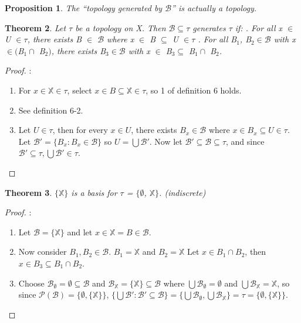 \documentclass{amsart}
\theoremstyle{plain}
\newtheorem{theorem}{Theorem}
\newtheorem{proposition}[theorem]{Proposition}
\theoremstyle{definition}
\theoremstyle{remark}
\begin{document}
	\begin{proposition}
		The ``topology generated by \(\mathcal{B}\)'' is actually a topology.
	\end{proposition}

	\begin{theorem}
	Let $\tau$ be a topology on X. Then $\mathcal{B} \subseteq \tau$ generates $\tau$ if:
	. For all x $\in$ U $\in \tau$, there exists B $\in$ $\mathcal{B}$ where x $\in$ B $\subseteq$ U $\in \tau$
	. For all B$_1$, B$_2 \in \mathcal{B}$ with x $\in ($B$_1 \cap$ B$_2)$, there exists B$_3 \in \mathcal{B}$ with x $\in$ B$_3 \subseteq$ B$_1 \cap$ B$_2$.
\end{theorem}
\begin{proof}:\newline
	\begin{enumerate}
		\item For $x \in \mathbb{X} \in \tau$, select $x \in B \subseteq \mathbb{X} \in \tau$, so 1 of definition 6 holds.
		\item See definition 6-2.
		\item Let $U \in \tau$, then for every $x \in U$, there exists $B_x \in \mathcal{B}$ where $x \in B_x \subseteq U \in \tau$. Let $\mathcal{B'} = \lbrace B_x : B_x \in \mathcal{B} \rbrace$ so $U = \bigcup \mathcal{B'}$. Now let $\mathcal{B'} \subseteq \mathcal{B} \subseteq \tau$, and since $\mathcal{B'} \subseteq \tau, \bigcup \mathcal{B'} \in \tau$.
		\end{enumerate}
\end{proof}

	\begin{theorem}
	$\lbrace\mathbb{X}\rbrace$ is a basis for $\tau$ = $\lbrace\emptyset$, $\mathbb{X}\rbrace$. (indiscrete)
	\end{theorem}
	\begin{proof}:\newline
	\begin{enumerate}
		\item Let $\mathcal{B} = \lbrace\mathbb{X}\rbrace$ and let $x \in \mathbb{X} = B \in \mathcal{B}$.
		\item Now consider $B_1, B_2 \in \mathcal{B}$. $B_1 = \mathbb{X}$ and $B_2 = \mathbb{X}$ Let $x \in B_1 \cap B_2$, then $x \in B_3 \subseteq B_1 \cap B_2$.
		\item Choose $\mathcal{B}_\emptyset = \emptyset \subseteq \mathcal{B}$ and $\mathcal{B}_\mathbb{X} = \lbrace \mathbb{X} \rbrace \subseteq \mathcal{B}$ where $\bigcup \mathcal{B}_\emptyset = \emptyset$ and $\bigcup \mathcal{B}_\mathbb{X} = \mathbb{X}$, so since $\mathcal{P}(\mathcal{B}) = \lbrace \emptyset, \lbrace \mathbb{X} \rbrace \rbrace$, $\lbrace \bigcup \mathcal{B'} : \mathcal{B'} \subseteq \mathcal{B} \rbrace = \lbrace \bigcup \mathcal{B}_\emptyset, \bigcup \mathcal{B}_\mathbb{X} \rbrace = \tau = \lbrace \emptyset, \lbrace \mathbb{X} \rbrace \rbrace$.
	\end{enumerate}
	\end{proof}
\end{document}
